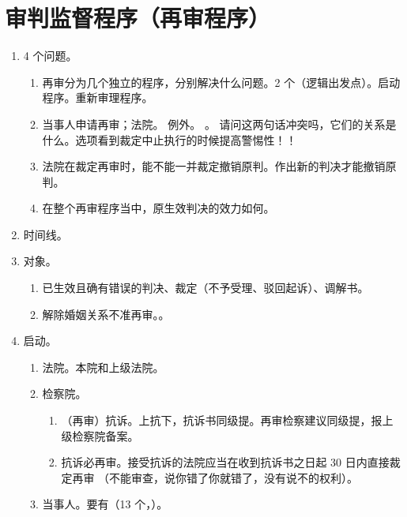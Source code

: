 \section{审判监督程序（再审程序）}
\begin{enumerate}
  \item 4 个问题。
        \begin{enumerate}
          \item 再审分为几个独立的程序，分别解决什么问题。2 个（逻辑出发点）。\yi 启动程序。\er 重新审理程序。
          \item 当事人申请再审；法院。
                例外。 \yjt {}。
                请问这两句话冲突吗，它们的关系是什么。选项看到裁定中止执行的时候提高警惕性！！
          \item 法院在裁定再审时，能不能一并裁定撤销原判。作出新的判决才能撤销原判。
          \item 在整个再审程序当中，原生效判决的效力如何。
        \end{enumerate}
  \item 时间线。
  \item 对象。
        \begin{enumerate}
          \item 已生效且确有错误的判决、裁定（不予受理、驳回起诉）、调解书。
          \item 解除婚姻关系不准再审。。
        \end{enumerate}
  \item 启动。
        \begin{enumerate}
          \item 法院。本院和上级法院。
          \item 检察院。
                \begin{enumerate}
                  \item （再审）抗诉。\yi 上抗下，抗诉书同级提。\er 再审检察建议同级提，报上级检察院备案。
                  \item 抗诉必再审。接受抗诉的法院应当在收到抗诉书之日起 30 日内直接裁定再审
                        （不能审查，说你错了你就错了，没有说不的权利）。
                \end{enumerate}
          \item 当事人。要有（13 个，）。
                \begin{enumerate}

\end{enumerate}
\end{enumerate}
\end{enumerate}
